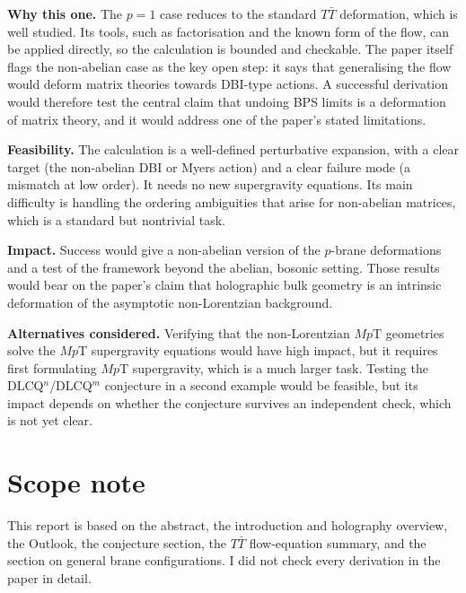\documentclass[11pt]{article}
\begin{document}
\textbf{Why this one.} The $p=1$ case reduces to the standard $T\bar T$ deformation, which is well studied. Its tools, such as factorisation and the known form of the flow, can be applied directly, so the calculation is bounded and checkable. The paper itself flags the non-abelian case as the key open step: it says that generalising the flow would deform matrix theories towards DBI-type actions. A successful derivation would therefore test the central claim that undoing BPS limits is a deformation of matrix theory, and it would address one of the paper's stated limitations.

\textbf{Feasibility.} The calculation is a well-defined perturbative expansion, with a clear target (the non-abelian DBI or Myers action) and a clear failure mode (a mismatch at low order). It needs no new supergravity equations. Its main difficulty is handling the ordering ambiguities that arise for non-abelian matrices, which is a standard but nontrivial task.

\textbf{Impact.} Success would give a non-abelian version of the $p$-brane deformations and a test of the framework beyond the abelian, bosonic setting. Those results would bear on the paper's claim that holographic bulk geometry is an intrinsic deformation of the asymptotic non-Lorentzian background.

\textbf{Alternatives considered.} Verifying that the non-Lorentzian $Mp$T geometries solve the $Mp$T supergravity equations would have high impact, but it requires first formulating $Mp$T supergravity, which is a much larger task. Testing the DLCQ${}^n$/DLCQ${}^m$ conjecture in a second example would be feasible, but its impact depends on whether the conjecture survives an independent check, which is not yet clear.

\section*{Scope note}

This report is based on the abstract, the introduction and holography overview, the Outlook, the conjecture section, the $T\bar T$ flow-equation summary, and the section on general brane configurations. I did not check every derivation in the paper in detail.
\end{document}
